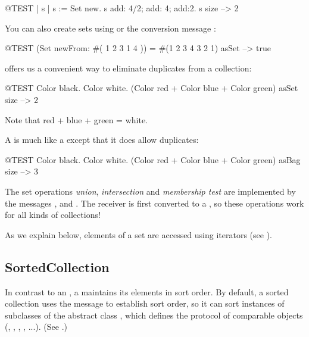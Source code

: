 \documentclass[a4paper,10pt,twoside]{book}
\begin{document}
\begin{code}{@TEST | s | }
s := Set new.
s add: 4/2; add: 4; add:2.
s size --> 2
\end{code}

You can also create sets using  or the conversion message :

\begin{code}{@TEST}
(Set newFrom: #( 1 2 3 1 4 )) = #(1 2 3 4 3 2 1) asSet --> true
\end{code}

 offers us a convenient way to eliminate duplicates from a collection:
\begin{code}{@TEST}
{ Color black. Color white. (Color red + Color blue + Color green) } asSet size --> 2
\end{code}
\noindent
Note that red + blue + green = white.

A  is much like a  except that it does allow duplicates:
\begin{code}{@TEST}
{ Color black. Color white. (Color red + Color blue + Color green) } asBag size --> 3
\end{code}

The set operations \emph{union}, \emph{intersection} and \emph{membership test} are implemented by the  messages ,  and .
The receiver is first converted to a , so these operations work for all kinds of collections!


As we explain below, elements of a set are accessed using iterators (see ).

\subsection{SortedCollection}
In contrast to an , a  maintains its elements in sort order. By default, a sorted collection uses the message  to establish sort order, so it can sort instances of subclasses of the abstract class , which defines the protocol of comparable objects (, , , , ...).
(See .)
\end{document}
